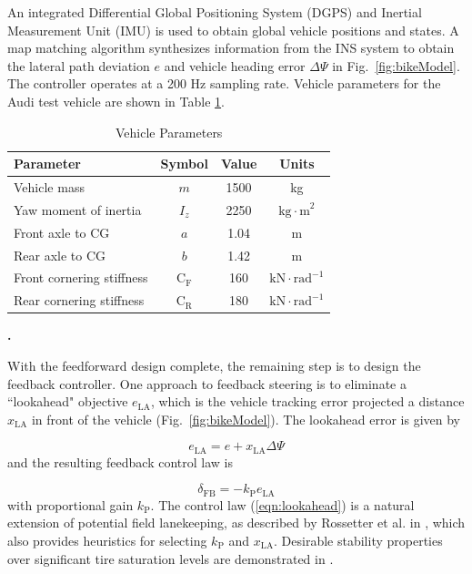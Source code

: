 \documentclass[10pt,a4paper]{article}
\def\section#1{\refstepcounter{section} \vspace{3.5mm} \noindent
{\normalsize\bf {\thesection.}} \hspace{0.5mm}{\normalsize\bf #1} \par \vspace{2mm}}
\begin{document}
An integrated Differential Global Positioning System (DGPS) and Inertial Measurement Unit (IMU) is used to obtain global vehicle positions and states. 
A map matching algorithm \cite{theodosis} synthesizes information from the INS system to obtain the lateral path deviation
$e$ and vehicle heading error $\Delta\Psi$ in Fig.~\ref{fig:bikeModel}. The controller operates at a 200 Hz sampling rate. Vehicle parameters for the Audi test vehicle are shown in Table \ref{tb:params}.

\begin{table}[h]
\small
\begin{center}
\caption{Vehicle Parameters}\label{tb:params}
\begin{tabular}{lccc}
Parameter & Symbol & Value & Units \\\hline
Vehicle mass & $m$ & 1500 & kg \\
Yaw moment of inertia & $I_z$ & 2250 & $\mathrm{kg \cdot m}^2$\\
Front axle to CG & $a$ & 1.04 & m\\
Rear axle to CG & $b$ & 1.42 & m\\
Front cornering stiffness & $\mathrm{C}_\mathrm{F}$ & 160 & $\mathrm{kN \cdot rad}^{-1}$ \\
Rear cornering stiffness & $\mathrm{C}_\mathrm{R}$ & 180 & $\mathrm{kN \cdot rad}^{-1}$ \\\hline
\end{tabular}
\end{center}
\end{table}

\section{LOOKAHEAD ERROR FEEDBACK}
\label{sec:lookahead}

With the feedforward design complete, the remaining step is to design the feedback controller. One approach to feedback steering is to eliminate a ``lookahead" objective $e_\mathrm{LA}$, which is the vehicle tracking error projected a distance 
$x_\mathrm{LA}$ in front of the vehicle (Fig.~\ref{fig:bikeModel}). The lookahead error is given by 

\begin{equation}
	e_\mathrm{LA}=e+x_\mathrm{LA}\Delta\Psi
\end{equation}
and the resulting feedback control law is

\begin{equation}
	\delta_\mathrm{FB} = -k_\mathrm{P}e_\mathrm{LA}
	\label{eqn:lookahead}
\end{equation}
with proportional gain $k_\mathrm{P}$. The control law (\ref{eqn:lookahead}) is a natural extension of potential field lanekeeping, as described by Rossetter et al. in \cite{rossetter2002}, which also provides heuristics for 
selecting $k_\mathrm{P}$ and $x_\mathrm{LA}$. Desirable stability properties over significant tire saturation levels are demonstrated in \cite{talvala}. 
\end{document}
